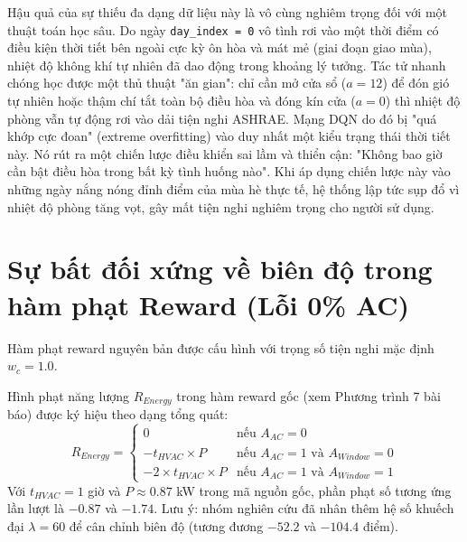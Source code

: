 \documentclass[12pt, a4paper]{report}
\begin{document}
Hậu quả của sự thiếu đa dạng dữ liệu này là vô cùng nghiêm trọng đối với một thuật toán học sâu. Do ngày \texttt{day\_index = 0} vô tình rơi vào một thời điểm có điều kiện thời tiết bên ngoài cực kỳ ôn hòa và mát mẻ (giai đoạn giao mùa), nhiệt độ không khí tự nhiên đã dao động trong khoảng lý tưởng. Tác tử nhanh chóng học được một thủ thuật "ăn gian": chỉ cần mở cửa sổ ($a = 12$) để đón gió tự nhiên hoặc thậm chí tắt toàn bộ điều hòa và đóng kín cửa ($a = 0$) thì nhiệt độ phòng vẫn tự động rơi vào dải tiện nghi ASHRAE. Mạng DQN do đó bị "quá khớp cực đoan" (extreme overfitting) vào duy nhất một kiểu trạng thái thời tiết này. Nó rút ra một chiến lược điều khiển sai lầm và thiển cận: "Không bao giờ cần bật điều hòa trong bất kỳ tình huống nào". Khi áp dụng chiến lược này vào những ngày nắng nóng đỉnh điểm của mùa hè thực tế, hệ thống lập tức sụp đổ vì nhiệt độ phòng tăng vọt, gây mất tiện nghi nghiêm trọng cho người sử dụng.

\section{Sự bất đối xứng về biên độ trong hàm phạt Reward (Lỗi 0\% AC)}
Hàm phạt reward nguyên bản được cấu hình với trọng số tiện nghi mặc định $w_c = 1.0$.

Hình phạt năng lượng $R_{Energy}$ trong hàm reward gốc (xem Phương trình 7 bài báo) được ký hiệu theo dạng tổng quát:
\begin{equation}
R_{Energy} =
\begin{cases}
0 & \text{nếu } A_{AC} = 0 \\[4pt]
-t_{HVAC} \times P & \text{nếu } A_{AC} = 1 \text{ và } A_{Window} = 0 \\[4pt]
-2 \times t_{HVAC} \times P & \text{nếu } A_{AC} = 1 \text{ và } A_{Window} = 1
\end{cases}
\end{equation}
Với $t_{HVAC} = 1$ giờ và $P \approx 0.87$ kW trong mã nguồn gốc, phần phạt số tương ứng lần lượt là $-0.87$ và $-1.74$. Lưu ý: nhóm nghiên cứu đã nhân thêm hệ số khuếch đại $\lambda = 60$ để cân chỉnh biên độ (tương đương $-52.2$ và $-104.4$ điểm).
\end{document}
